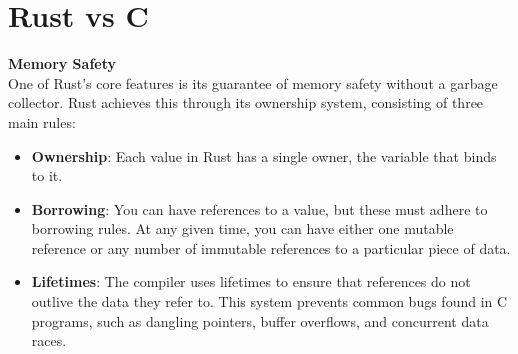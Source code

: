 \section*{Rust vs C}
\textbf{Memory Safety}\\
One of Rust's core features is its guarantee of memory safety without a garbage collector. Rust achieves this through its ownership system, consisting of three main rules:
\begin{itemize}
	\item \textbf{Ownership}: Each value in Rust has a single owner, the variable that binds to it.
	\item \textbf{Borrowing}: You can have references to a value, but these must adhere to borrowing rules. At any given time, you can have either one mutable reference or any number of immutable references to a particular piece of data.
	\item \textbf{Lifetimes}: The compiler uses lifetimes to ensure that references do not outlive the data they refer to.
This system prevents common bugs found in C programs, such as dangling pointers, buffer overflows, and concurrent data races.
\end{itemize}

